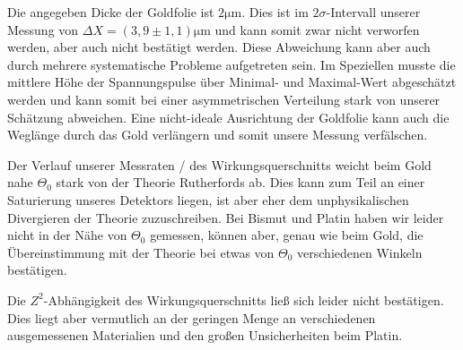 Die angegeben Dicke der Goldfolie ist $2\si{\micro\meter}$.
Dies ist im $2\sigma$-Intervall unserer Messung von $\Delta X = (3,9 \pm 1,1)\si{\micro\meter}$ und kann somit zwar nicht verworfen werden,
aber auch nicht bestätigt werden. Diese Abweichung kann aber auch durch mehrere systematische Probleme aufgetreten sein.
Im Speziellen musste die mittlere Höhe der Spannungspulse über Minimal- und Maximal-Wert abgeschätzt werden und kann somit bei einer
asymmetrischen Verteilung stark von unserer Schätzung abweichen.
Eine nicht-ideale Ausrichtung der Goldfolie kann auch die Weglänge durch das Gold verlängern und somit unsere Messung verfälschen.

Der Verlauf unserer Messraten / des Wirkungsquerschnitts weicht beim Gold nahe $\Theta_0$ stark von der Theorie Rutherfords ab.
Dies kann zum Teil an einer Saturierung unseres Detektors liegen,
ist aber eher dem unphysikalischen Divergieren der Theorie zuzuschreiben.
Bei Bismut und Platin haben wir leider nicht in der Nähe von $\Theta_0$ gemessen,
können aber, genau wie beim Gold, die Übereinstimmung mit der Theorie bei etwas von $\Theta_0$ verschiedenen Winkeln bestätigen.

Die $Z^2$-Abhängigkeit des Wirkungsquerschnitts ließ sich leider nicht bestätigen.
Dies liegt aber vermutlich an der geringen Menge an verschiedenen ausgemessenen Materialien und den großen Unsicherheiten beim Platin.